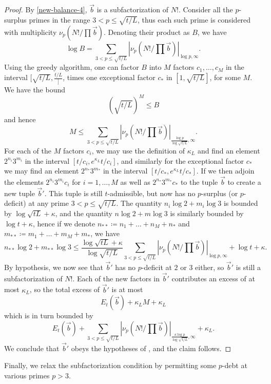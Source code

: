 \documentclass[12pt,a4paper,reqno]{amsart}
\numberwithin{equation}{section}
\theoremstyle{plain}
\theoremstyle{definition}
\begin{document}
\begin{proof} By \eqref{new-balance-4}, $\vec b$ is a subfactorization of $N!$. Consider all the $p$-surplus primes in the range $3 < p \leq \sqrt{t/L}$, thus each such prime is considered with multiplicity $\nu_p(N!/\prod \vec b)$.  Denoting their product as $B$, we have
  $$ \log B = \sum_{3 < p \leq \sqrt{t/L}}
  |\nu_p(N!/\prod \vec b)|_{\log p,\infty}.$$
Using the greedy algorithm, one can factor $B$ into $M$ factors $c_1,\dots,c_M$ in the interval $[\sqrt{t/L}, \frac{t/L}]$, times one exceptional factor $c_*$ in $[1,\sqrt{t/L}]$, for some $M$.  We have the bound
$$ (\sqrt{t/L})^M \leq B$$
and hence
$$ M \leq \sum_{3 < p \leq \sqrt{t/L}}
|\nu_p(N!/\prod \vec b)|_{\frac{\log p}{\log\sqrt{t/L}},\infty}.$$
For each of the $M$ factors $c_i$, we may use the definition of $\kappa_L$ and find an element $2^{n_i} 3^{m_i}$ in the interval $[t/c_i,e^{\kappa_L} t/c_i]$, and similarly for the exceptional factor $c_*$ we may find an element $2^{n_*} 3^{m_*}$ in the interval $[t/c_*,e^{\kappa_L} t/c_*]$.  If we then adjoin the elements $2^{n_i} 3^{m_i} c_i$ for $i=1,\dots,M$ as well as $2^{n_*} 3^{m_*} c_*$ to the tuple $\vec b$ to create a new tuple $\vec b'$.  This tuple is still $t$-admissible, but now has no $p$-surplus (or $p$-deficit) at any prime $3 < p \leq \sqrt{t/L}$.  The quantity $n_i \log 2 + m_i \log 3$ is bounded by $\log \sqrt{tL} + \kappa$, and the quantity $n \log 2 + m \log 3$ is similarly bounded by $\log t + \kappa$, hence if we denote $n_{**} \coloneqq n_1 + \dots + n_M + n_*$ and $m_{**} \coloneqq m_1 + \dots + m_M + m_*$, we have
$$ n_{**} \log 2 + m_{**} \log 3 \leq 
\frac{\log \sqrt{tL} + \kappa}{\log\sqrt{t/L}}
\sum_{3 < p \leq \sqrt{t/L}}
|\nu_p(N!/\prod \vec b)|_{\log p,\infty}
+ \log t + \kappa.$$
By hypothesis, we now see that $\vec b'$ has no $p$-deficit at $2$ or $3$ either, so $\vec b'$ is still a subfactorization of $N!$.  Each of the new factors in $\vec b'$ contributes an excess of at most $\kappa_L$, so the total excess of $\vec b'$ is at most
$$ E_t(\vec b) + \kappa_L M + \kappa_L$$
which is in turn bounded by
$$ E_t(\vec b) + \sum_{3 < p \leq \sqrt{t/L}}
|\nu_p(N!/\prod \vec b)|_{\frac{\kappa \log p}{\log\sqrt{t/L}},\infty} + \kappa_L.$$
We conclude that $\vec b'$ obeys the hypotheses of , and the claim follows.
\end{proof}

Finally, we relax the subfactorization condition by permitting some $p$-debt at various primes $p>3$.
\end{document}
